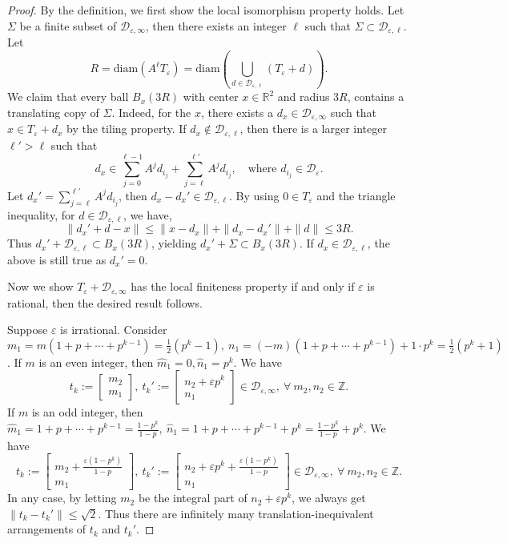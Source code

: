 \documentclass[12pt, reqno]{amsart}
\numberwithin{equation}{section}
\begin{document}
\begin{proof}
By the definition, we first show the local isomorphism property holds. Let $\Sigma$ be a finite subset of ${\mathcal D}_{\varepsilon,\infty}$, then there exists an integer $\ell$ such that $\Sigma\subset {\mathcal D}_{\varepsilon,\ell}$. Let $$R=\text{diam}(A^\ell T_\varepsilon)=\text{diam}(\bigcup_{d\in {\mathcal D}_{\varepsilon,\ell}}(T_\varepsilon+d)).$$ We claim that every ball $B_x(3R)$ with center $x\in {\mathbb R}^2$ and radius $3R$, contains a translating copy of $\Sigma$. Indeed, for the $x$, there exists a $d_x\in {\mathcal D}_{\varepsilon,\infty}$ such that $x\in T_\varepsilon+d_x$ by the tiling property. If $d_x\notin {\mathcal D}_{\varepsilon,\ell}$, then there is a larger integer $\ell'>\ell$ such that
$$d_x\in \sum_{j=0}^{\ell-1}A^jd_{i_j}+\sum_{j=\ell}^{\ell'}A^jd_{i_j}, \quad \text{where } d_{i_j}\in {\mathcal D}_\varepsilon.$$ Let $d_x'=\sum_{j=\ell}^{\ell'}A^jd_{i_j}$, then $d_x-d_x'\in {\mathcal D}_{\varepsilon,\ell}$. By using $0\in T_\varepsilon$ and the triangle inequality,  for $d\in {\mathcal D}_{\varepsilon,\ell}$, we have, $$\|d_x'+d-x\|\le  \|x-d_x\|+\|d_x-d_x'\|+\|d\|\le 3R.$$
Thus $d_x'+{\mathcal D}_{\varepsilon,\ell}\subset B_x(3R)$, yielding $d_x'+\Sigma\subset B_x(3R)$. If $d_x\in {\mathcal D}_{\varepsilon,\ell}$, the above is still true as $d_x'=0$.

Now we show $T_\varepsilon+{\mathcal D}_{\varepsilon,\infty}$ has the local finiteness property if and only if $\varepsilon$ is rational, then the desired result follows.

Suppose $\varepsilon$ is irrational. Consider $m_1=m(1+p+\cdots+p^{k-1})=\frac{1}{2}(p^k-1), \   n_1=(-m)(1+p+\cdots+p^{k-1})+ 1\cdot p^k=\frac{1}{2}(p^k+1)$. If $m$ is an even integer, then $\widehat{m}_1=0, \widehat{n}_1=p^k$. We have $$t_k:=\left[\begin{array}{c}
m_2\\
m_1
\end{array}\right], \   t_k':=\left[\begin{array}{c}
n_2+\varepsilon p^k\\
n_1
\end{array}\right]\in {\mathcal D}_{\varepsilon,\infty},  \  \forall  \   m_2, n_2\in {\mathbb Z}.$$
If $m$ is an odd integer, then $\widehat{m}_1=1+p+\cdots+p^{k-1}=\frac{1-p^k}{1-p},\ \widehat{n}_1=1+p+\cdots+p^{k-1}+p^k=\frac{1-p^k}{1-p}+p^k$. We have $$t_k:=\left[\begin{array}{c}
m_2+\frac{\varepsilon(1-p^k)}{1-p}\\
m_1
\end{array}\right], \   t_k':=\left[\begin{array}{c}
n_2+\varepsilon p^k+\frac{\varepsilon(1-p^k)}{1-p}\\
n_1
\end{array}\right]\in {\mathcal D}_{\varepsilon,\infty},  \  \forall  \  m_2, n_2\in {\mathbb Z}.$$
In any case, by letting $m_2$ be the integral part of $n_2+\varepsilon p^k$, we always get  $\|t_k-t_k'\|\le \sqrt{2}$. Thus there are infinitely many translation-inequivalent arrangements of $t_k$ and $t_k'$.


\end{proof}
\end{document}

